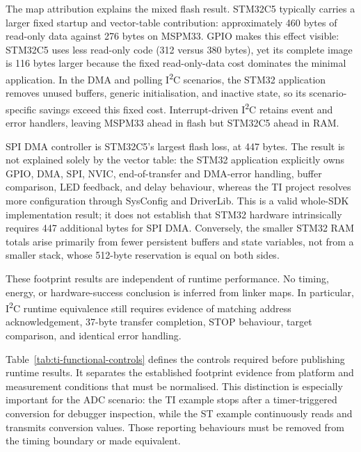 The map attribution explains the mixed flash result. STM32C5 typically carries a larger fixed
startup and vector-table contribution: approximately 460 bytes of read-only data against
276 bytes on MSPM33. GPIO makes this effect visible: STM32C5 uses less read-only code
(312 versus 380 bytes), yet its complete image is 116 bytes larger because the fixed
read-only-data cost dominates the minimal application. In the DMA and polling I\textsuperscript{2}C
scenarios, the STM32 application removes unused buffers, generic initialisation, and inactive
state, so its scenario-specific savings exceed this fixed cost. Interrupt-driven I\textsuperscript{2}C
retains event and error handlers, leaving MSPM33 ahead in flash but STM32C5 ahead in RAM.

SPI DMA controller is STM32C5's largest flash loss, at 447 bytes. The result is not explained
solely by the vector table: the STM32 application explicitly owns GPIO, DMA, SPI, NVIC,
end-of-transfer and DMA-error handling, buffer comparison, LED feedback, and delay behaviour,
whereas the TI project resolves more configuration through SysConfig and DriverLib. This is a
valid whole-SDK implementation result; it does not establish that STM32 hardware intrinsically
requires 447 additional bytes for SPI DMA. Conversely, the smaller STM32 RAM totals arise
primarily from fewer persistent buffers and state variables, not from a smaller stack, whose
512-byte reservation is equal on both sides.

These footprint results are independent of runtime performance. No timing, energy, or
hardware-success conclusion is inferred from linker maps. In particular, I\textsuperscript{2}C
runtime equivalence still requires evidence of matching address acknowledgement, 37-byte
transfer completion, STOP behaviour, target comparison, and identical error handling.

Table~\ref{tab:ti-functional-controls} defines the controls required before publishing runtime
results. It separates the established footprint evidence from platform and measurement
conditions that must be normalised. This distinction is especially important for the ADC
scenario: the TI example stops after a timer-triggered conversion for debugger inspection,
while the ST example continuously reads and transmits conversion values. Those reporting
behaviours must be removed from the timing boundary or made equivalent.

